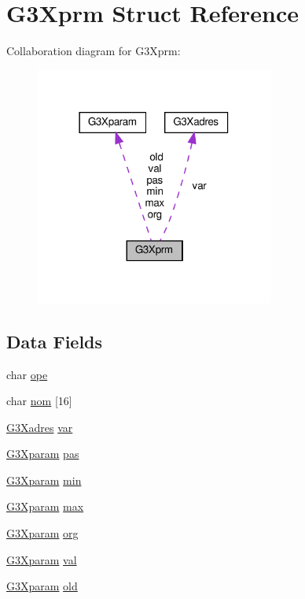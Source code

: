 \hypertarget{struct_g3_xprm}{}\section{G3\+Xprm Struct Reference}
\label{struct_g3_xprm}


Collaboration diagram for G3\+Xprm\+:\nopagebreak
\begin{figure}[H]
\begin{center}
\leavevmode
\includegraphics[width=222pt]{struct_g3_xprm__coll__graph}
\end{center}
\end{figure}
\subsection*{Data Fields}
\begin{DoxyCompactItemize}
\item 
char \hyperlink{struct_g3_xprm_a855b08d072a849c277e92b629e3eaddb}{ope}
\item 
char \hyperlink{struct_g3_xprm_a4e9b04711448362dbab666d433567f34}{nom} \mbox{[}16\mbox{]}
\item 
\hyperlink{struct_g3_xadres}{G3\+Xadres} \hyperlink{struct_g3_xprm_a354591d125c7cd20f2fcec10cdb15188}{var}
\item 
\hyperlink{struct_g3_xparam}{G3\+Xparam} \hyperlink{struct_g3_xprm_ab69882f819bf766798d589ebdcb88810}{pas}
\item 
\hyperlink{struct_g3_xparam}{G3\+Xparam} \hyperlink{struct_g3_xprm_a1e453f453193191f86ef66743034a5e9}{min}
\item 
\hyperlink{struct_g3_xparam}{G3\+Xparam} \hyperlink{struct_g3_xprm_a254ef12f104f240e2c82a0f6850c1604}{max}
\item 
\hyperlink{struct_g3_xparam}{G3\+Xparam} \hyperlink{struct_g3_xprm_a47d33e71270284b7a2894e05d2e027f1}{org}
\item 
\hyperlink{struct_g3_xparam}{G3\+Xparam} \hyperlink{struct_g3_xprm_a4d4fb5e18a33888fe4983e76456c66c9}{val}
\item 
\hyperlink{struct_g3_xparam}{G3\+Xparam} \hyperlink{struct_g3_xprm_a5d42b0a6c39faee9e535f8e14181e26c}{old}
\end{DoxyCompactItemize}


